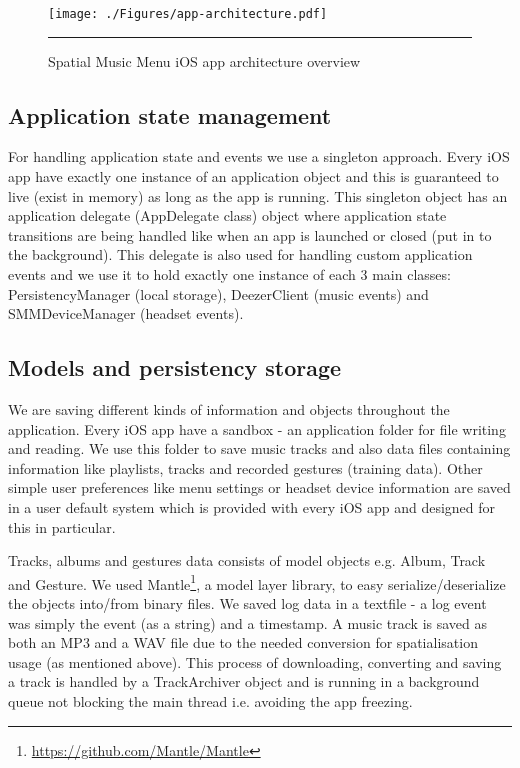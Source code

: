 \begin{figure}[t]
  \centering
    \texttt{[image: ./Figures/app-architecture.pdf]}
    \rule{35em}{1pt}
  \caption[App architecture]{Spatial Music Menu iOS app architecture overview}
  \label{fig:apparchitecture}
\end{figure}

\subsection{Application state management}
For handling application state and events we use a singleton approach. Every iOS app have exactly one instance of an application object and this is guaranteed to live (exist in memory) as long as the app is running. This singleton object has an application delegate (AppDelegate class) object where application state transitions are being handled like when an app is launched or closed (put in to the background). This delegate is also used for handling custom application events and we use it to hold exactly one instance of each 3 main classes: PersistencyManager (local storage), DeezerClient (music events) and SMMDeviceManager (headset events). 

\subsection{Models and persistency storage}
\label{sec:modelsandpersistency}
We are saving different kinds of information and objects throughout the application. Every iOS app have a sandbox - an application folder for file writing and reading. We use this folder to save music tracks and also data files containing information like playlists, tracks and recorded gestures (training data). Other simple user preferences like menu settings or headset device information are saved in a user default system which is provided with every iOS app and designed for this in particular.

Tracks, albums and gestures data consists of model objects e.g. Album, Track and Gesture. We used Mantle\footnote{\url{https://github.com/Mantle/Mantle}}, a model layer library, to easy serialize/deserialize the objects into/from binary files. We saved log data in a textfile - a log event was simply the event (as a string) and a timestamp. A music track is saved as both an MP3 and a WAV file due to the needed conversion for spatialisation usage (as mentioned above). This process of downloading, converting and saving a track is handled by a TrackArchiver object and is running in a background queue not blocking the main thread i.e. avoiding the app freezing.

